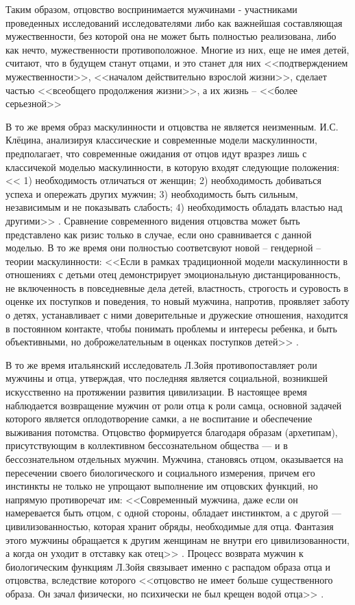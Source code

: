 \documentclass{../../common/thesisbyxetex}
\begin{document}
Таким образом, отцовство воспринимается мужчинами - участниками проведенных
исследований исследователями либо как важнейшая составляющая
мужественности, без которой она не может быть полностью реализована, либо как нечто, мужественности
противоположное. Многие из них, еще не имея детей, считают, что в будущем станут отцами, и это
станет для них <<подтверждением мужественности>>, <<началом действительно взрослой жизни>>, сделает
частью <<всеобщего продолжения жизни>>, а их жизнь -- <<более серьезной>> \cite[367]{tri}



В то же время образ маскулинности и отцовства не является неизменным. И.С. Клёцина, анализируя
классические и современные модели маскулинности, предполагает, что современные ожидания от отцов
идут вразрез лишь с классичекой моделью маскулинности, в которую входят следующие положения:
<< 1) необходимость отличаться от женщин; 2)
необходимость добиваться успеха и опережать других мужчин; 3) необходимость быть сильным,
независимым и не показывать слабость; 4) необходимость обладать властью над другими>> \cite{clec}.
Сравнение современного видения отцовства может быть представлено как ризис только в случае, если
оно сравнивается с данной моделью.
В то же время они полностью соответсвуют новой -- гендерной -- теории маскулинности: <<Если в рамках
традиционной модели маскулинности в отношениях с детьми отец демонстрирует эмоциональную
дистанцированность, не включенность в повседневные дела детей, властность, строгость и суровость в
оценке их поступков и поведения, то новый мужчина, напротив, проявляет заботу о детях, устанавливает
с ними доверительные и дружеские отношения, находится в постоянном контакте, чтобы понимать проблемы
и интересы ребенка, и быть объективными, но доброжелательным в оценках поступков детей>>
\cite{clec}.

В то же время итальянский исследователь Л.Зойя противопоставляет роли
мужчины и отца, утверждая, что последняя является социальной,
возникшей искусственно на протяжении развития цивилизации. В настоящее время наблюдается
возвращение мужчин от роли отца к роли самца, основной задачей которого является оплодотворение
самки, а не воспитание и обеспечение выживания потомства. Отцовство формируется благодаря
образам (архетипам), присутствующим в коллективном бессознательном общества --- и в
бессознательном отдельных мужчин. Мужчина, становясь отцом, оказывается на пересечении
своего биологического и социального измерения, причем его инстинкты не только не упрощают
выполнение им отцовских функций, но напрямую противоречат им: <<Современный мужчина, даже
если он намеревается быть отцом, с одной стороны, обладает инстинктом, а с другой ---
цивилизованностью, которая хранит обряды, необходимые для отца. Фантазия этого мужчины
обращается к другим женщинам не внутри его цивилизованности, а когда он уходит в отставку
как отец>> \cite[270]{zo}. Процесс возврата мужчин к биологическим функциям Л.Зойя связывает
именно с распадом образа отца и отцовства, вследствие которого <<отцовство не имеет больше
существенного образа. Он зачал физически, но психически не был крещен водой отца>> \cite[270]{zo}.
\end{document}
